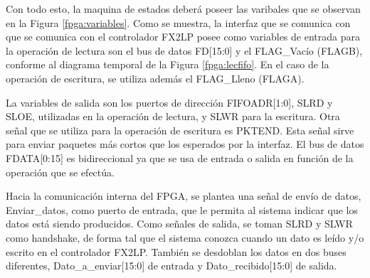 Con todo esto, la maquina de estados deberá poseer las varibales que se observan en la Figura \ref{fpga:variables}. Como se muestra, la interfaz que se comunica con que se comunica con el controlador FX2LP posee como variables de entrada para la operación de lectura son el bus de datos {FD[15:0]} y el {FLAG\_Vacío} (FLAGB), conforme al diagrama temporal de la Figura \ref{fpga:lecfifo}. En el caso de la operación de escritura, se utiliza además el {FLAG\_Lleno} (FLAGA).

La variables de salida son los puertos de dirección {FIFOADR[1:0]}, SLRD y SLOE, utilizadas en la operación de lectura, y SLWR para la escritura. Otra señal que se utiliza para la operación de escritura es PKTEND. Esta señal sirve para enviar paquetes más cortos que los esperados por la interfaz. El bus de datos FDATA[0:15] es bidireccional ya que se usa de entrada o salida en función de la operación que se efectúa.

Hacia la comunicación interna del FPGA, se plantea una señal de envío de datos, Enviar\_datos, como puerto de entrada, que le permita al sistema indicar que los datos está siendo producidos. Como señales de salida, se toman SLRD y SLWR como handshake, de forma tal que el sistema conozca cuando un dato es leído y/o escrito en el controlador FX2LP. También se desdoblan los datos en dos buses diferentes, Dato\_a\_enviar[15:0] de entrada y Dato\_recibido[15:0] de salida.

